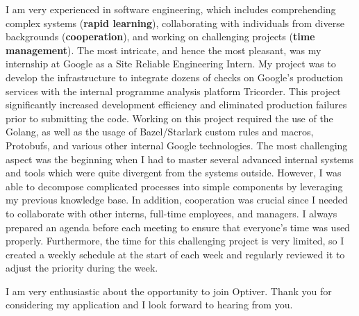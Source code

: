 \documentclass[11pt, a4paper]{awesome-cv}
\begin{document}
\begin{cvletter}
I am very experienced in software engineering, which includes comprehending complex systems (\textbf{rapid learning}), collaborating with individuals from diverse backgrounds (\textbf{cooperation}), and working on challenging projects (\textbf{time management}). The most intricate, and hence the most pleasant, was my internship at Google as a Site Reliable Engineering Intern. My project was to develop the infrastructure to integrate dozens of checks on Google’s production services with the internal programme analysis platform Tricorder. This project significantly increased development efficiency and eliminated production failures prior to submitting the code. Working on this project required the use of the Golang, as well as the usage of Bazel/Starlark custom rules and macros, Protobufs, and various other internal Google technologies. The most challenging aspect was the beginning when I had to master several advanced internal systems and tools which were quite divergent from the systems outside. However, I was able to decompose complicated processes into simple components by leveraging my previous knowledge base. In addition, cooperation was crucial since I needed to collaborate with other interns, full-time employees, and managers. I always prepared an agenda before each meeting to ensure that everyone’s time was used properly. Furthermore, the time for this challenging project is very limited, so I created a weekly schedule at the start of each week and regularly reviewed it to adjust the priority during the week. 

I am very enthusiastic about the opportunity to join Optiver. Thank you for considering my application and I look forward to hearing from you. 
\end{cvletter}


\makeletterclosing
\end{document}
